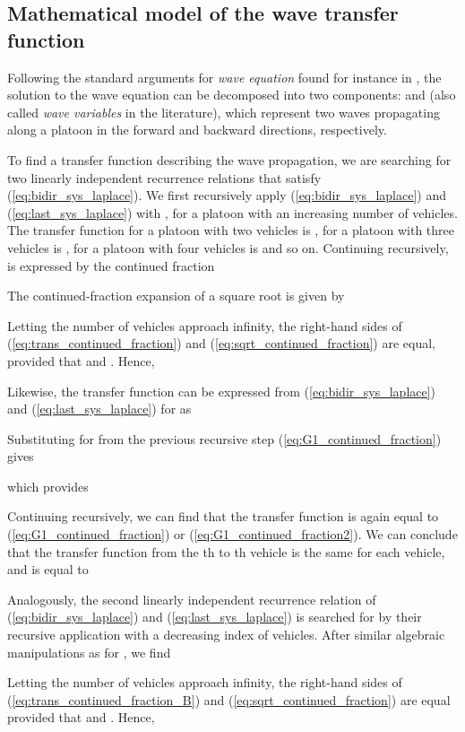\documentclass[final,5p,times,twocolumn]{elsarticle}
\begin{document}
\subsection{Mathematical model of the wave transfer function}
Following the standard arguments for \emph{wave equation} found for instance in \cite{Asmar2004}, the solution to the wave equation can be decomposed into two components:  and  (also called \emph{wave variables} in the literature), which represent two waves propagating along a platoon in the forward and backward directions, respectively.

To find a transfer function describing the wave propagation, we are searching for two linearly independent recurrence relations that satisfy (\ref{eq:bidir_sys_laplace}). We first recursively apply (\ref{eq:bidir_sys_laplace}) and (\ref{eq:last_sys_laplace}) with , for a platoon with an increasing number of vehicles. The transfer function for a platoon with two vehicles is , for a platoon with three vehicles is , for a platoon with four vehicles is  and so on. Continuing recursively,  is expressed by the continued fraction

The continued-fraction expansion of a square root is given by \cite{jones1984}

Letting the number of vehicles approach infinity, the right-hand sides of (\ref{eq:trans_continued_fraction}) and (\ref{eq:sqrt_continued_fraction}) are equal, provided that  and . Hence,

Likewise, the transfer function  can be expressed from (\ref{eq:bidir_sys_laplace}) and (\ref{eq:last_sys_laplace}) for  as

Substituting for  from the previous recursive step (\ref{eq:G1_continued_fraction}) gives

which provides

Continuing recursively, we can find that the transfer function  is again equal to (\ref{eq:G1_continued_fraction}) or (\ref{eq:G1_continued_fraction2}). We can conclude that the transfer function from the th to th vehicle is the same for each vehicle, and is equal to


Analogously, the second linearly independent recurrence relation of (\ref{eq:bidir_sys_laplace}) and (\ref{eq:last_sys_laplace}) is searched for by their recursive application with a decreasing index of vehicles. After similar algebraic manipulations as for , we find

Letting the number of vehicles approach infinity, the right-hand sides of (\ref{eq:trans_continued_fraction_B}) and (\ref{eq:sqrt_continued_fraction}) are equal provided that  and . Hence,
\end{document}
